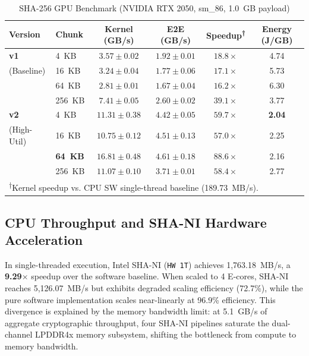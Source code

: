 \begin{table}[htbp]
\centering
\caption{SHA-256 GPU Benchmark (NVIDIA RTX 2050, sm\_86, 1.0~GB payload)}
\label{tab:gpu_results}
\begin{tabular}{llcccc}
\hline\hline
\textbf{Version} & \textbf{Chunk} & \textbf{Kernel (GB/s)} & \textbf{E2E (GB/s)} & \textbf{Speedup\textsuperscript{†}} & \textbf{Energy (J/GB)} \\
\hline
\textbf{v1} & 4~KB   & $3.57 \pm 0.02$ & $1.92 \pm 0.01$ & $18.8\times$ & 4.74 \\
(Baseline)  & 16~KB  & $3.24 \pm 0.04$ & $1.77 \pm 0.06$ & $17.1\times$ & 5.73 \\
            & 64~KB  & $2.81 \pm 0.01$ & $1.67 \pm 0.04$ & $16.2\times$ & 6.30 \\
            & 256~KB & $7.41 \pm 0.05$ & $2.60 \pm 0.02$ & $39.1\times$ & 3.77 \\
\hline
\textbf{v2} & 4~KB   & $11.31 \pm 0.38$ & $4.42 \pm 0.05$ & $59.7\times$ & \textbf{2.04} \\
(High-Util) & 16~KB  & $10.75 \pm 0.12$ & $4.51 \pm 0.13$ & $57.0\times$ & 2.25 \\
            & \textbf{64~KB}  & $\mathbf{16.81 \pm 0.48}$ & $4.61 \pm 0.18$ & $\mathbf{88.6\times}$ & 2.16 \\
            & 256~KB & $11.07 \pm 0.10$ & $3.71 \pm 0.01$ & $58.4\times$ & 2.77 \\
\hline\hline
\multicolumn{6}{l}{\textsuperscript{†}Kernel speedup vs. CPU SW single-thread baseline (189.73~MB/s).} \\
\end{tabular}
\end{table}

\subsection{CPU Throughput and SHA-NI Hardware Acceleration}

In single-threaded execution, Intel SHA-NI (\texttt{HW 1T}) achieves 1,763.18~MB/s, a \textbf{9.29$\times$} speedup over the software baseline. When scaled to 4 E-cores, SHA-NI reaches 5,126.07~MB/s but exhibits degraded scaling efficiency (72.7\%), while the pure software implementation scales near-linearly at 96.9\% efficiency. This divergence is explained by the memory bandwidth limit: at 5.1~GB/s of aggregate cryptographic throughput, four SHA-NI pipelines saturate the dual-channel LPDDR4x memory subsystem, shifting the bottleneck from compute to memory bandwidth.

